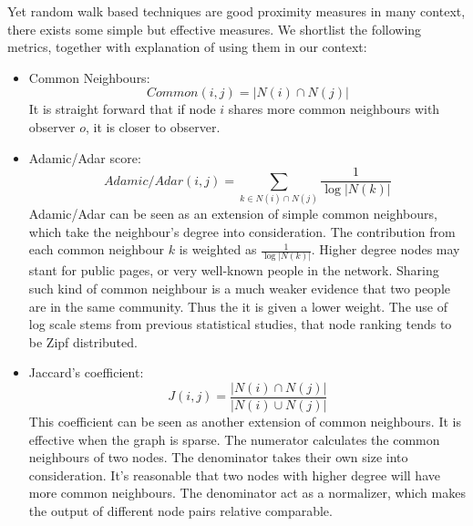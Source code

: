 \documentclass[11pt,a4paper]{article}
\begin{document}
Yet random walk based techniques are good proximity measures in many context, 
there exists some simple but effective measures. We shortlist the following 
metrics, together with explanation of using them in our context:
	\begin{itemize}
		\item Common Neighbours:
		\begin{equation}
			Common(i,j) = | N(i) \cap N(j) |
			\label{eq:common}
		\end{equation}
		It is straight forward that if node $i$ shares more common neighbours 
		with observer $o$, it is closer to observer. 
		
		\item Adamic/Adar score:
		\begin{equation}
			Adamic/Adar(i,j) = \sum_{k \in N(i) \cap N(j) }{\frac{1}{\log{|N(k)|}}}
			\label{eq:adar}
		\end{equation}
		Adamic/Adar can be seen as an extension of simple common neighbours, which 
		take the neighbour's degree into consideration. The contribution from 
		each common neighbour $k$ is weighted as $\frac{1}{\log{|N(k)|}}$. 
		Higher degree nodes may stant for public pages, or very well-known people 
		in the network. Sharing such kind of common neighbour is a much weaker 
		evidence that two people are in the same community. Thus the it is given 
		a lower weight. The use of log scale stems from previous statistical studies, 
		that node ranking tends to be Zipf distributed. \cite{breslau1999web-zipf}
		
		\item Jaccard's coefficient:
		\begin{equation}
			J(i,j)=\frac{|N(i) \cap N(j) |}{|N(i) \cup N(j) |}
			\label{jaccards}
		\end{equation}
		This coefficient can be seen as another extension of common neighbours. 
		It is effective when the graph is sparse. The numerator calculates the 
		common neighbours of two nodes. The denominator takes their own size
		into consideration. It's reasonable that two nodes with higher degree 
		will have more common neighbours. The denominator act as a normalizer, 
		which makes the output of different node pairs relative comparable. 
	\end{itemize}
\end{document}
